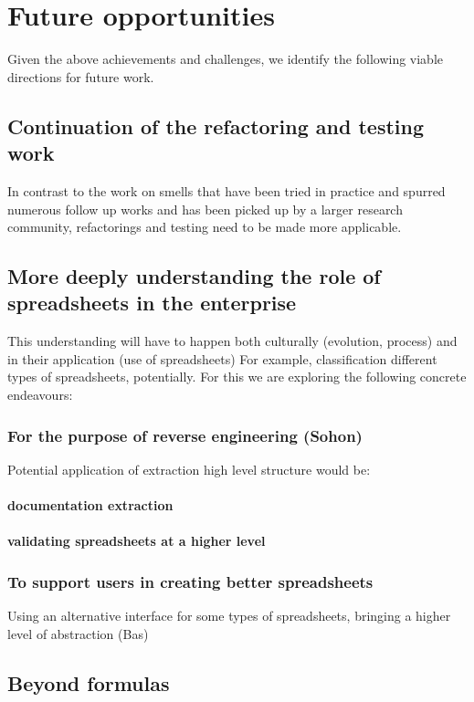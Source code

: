 \documentclass[conference]{IEEEtran}
\begin{document}
\section{Future opportunities}
Given the above achievements  and challenges, we identify the following viable directions for future work.

\subsection{Continuation of the refactoring and testing work}
In contrast to the work on smells that have been tried in practice and spurred numerous follow up works and has been picked up by a larger research community, refactorings and testing need to be made more applicable.

\subsection{More deeply understanding the role of spreadsheets in the enterprise}
This understanding will have to happen both culturally (evolution, process) and in their application (use of spreadsheets) For example, classification different types of spreadsheets, potentially. For this we are exploring the following concrete endeavours:

\subsubsection{For the purpose of reverse engineering (Sohon)}
Potential application of extraction high level structure would be:
\paragraph{documentation extraction}
\paragraph{validating spreadsheets at a higher level}

\subsubsection{To support users in creating better spreadsheets}
Using  an alternative interface for some types of spreadsheets, bringing a higher level of abstraction (Bas)

\subsection{Beyond formulas}
\end{document}
